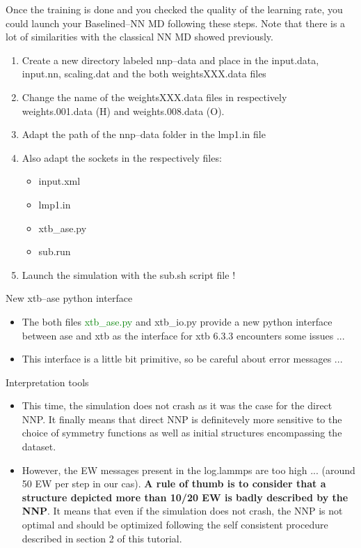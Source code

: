 \documentclass[12pt]{article}
\begin{document}
Once the training is done and you checked the quality of the learning rate, you could launch your Baselined--NN MD following these steps. Note that there is a lot of similarities with the classical NN MD showed previously.
\begin{enumerate}
    \item Create a new directory labeled nnp--data and place in the input.data, input.nn, scaling.dat and the both weightsXXX.data files
    \item Change the name of the weightsXXX.data files in respectively weights.001.data (H) and weights.008.data (O).
    \item Adapt the path of the nnp--data folder in the lmp1.in file
    \item Also adapt the sockets in the respectively files:
    \begin{itemize}
        \item input.xml
        \item lmp1.in
        \item xtb\_ase.py
        \item sub.run
    \end{itemize}
    \item Launch the simulation with the sub.sh script file !
\end{enumerate}

\begin{mybox1}{New xtb--ase python interface}
\begin{itemize}
    \item The both files \textcolor{green}{xtb\_ase.py} and xtb\_io.py provide a new python interface between ase and xtb as the interface for xtb 6.3.3 encounters some issues ...
    \item This interface is a little bit primitive, so be careful about error messages ...
\end{itemize}
\end{mybox1}

\begin{mybox1}{Interpretation tools}
\begin{itemize}
    \item This time, the simulation does not crash as it was the case for the direct NNP. It finally means that direct NNP is definitevely more sensitive to the choice of symmetry functions as well as initial structures encompassing the dataset. 
    \item However, the EW messages present in the log.lammps are too high ... (around 50 EW per step in our cas). \textbf{A rule of thumb is to consider that a structure depicted more than 10/20 EW is badly described by the NNP}. It means that even if the simulation does not crash, the NNP is not optimal and should be optimized following the self consistent procedure described in section 2 of this tutorial.
\end{itemize}
\end{mybox1}
%
\end{document}
